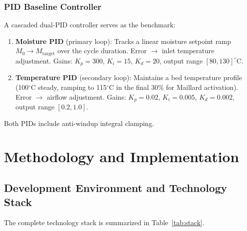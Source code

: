 ﻿\documentclass[12pt, a4paper]{report}
\begin{document}
\subsection{PID Baseline Controller}
A cascaded dual-PID controller serves as the benchmark:
\begin{enumerate}
    \item \textbf{Moisture PID} (primary loop): Tracks a linear moisture setpoint ramp $M_0 \to M_{\text{target}}$ over the cycle duration. Error $\to$ inlet temperature adjustment. Gains: $K_p = 300$, $K_i = 15$, $K_d = 20$, output range $[80, 130]^\circ$C.
    \item \textbf{Temperature PID} (secondary loop): Maintains a bed temperature profile (100$^\circ$C steady, ramping to 115$^\circ$C in the final 30\% for Maillard activation). Error $\to$ airflow adjustment. Gains: $K_p = 0.02$, $K_i = 0.005$, $K_d = 0.002$, output range $[0.2, 1.0]$.
\end{enumerate}
Both PIDs include anti-windup integral clamping.


\chapter{Methodology and Implementation}

\section{Development Environment and Technology Stack}
The complete technology stack is summarized in Table~\ref{tab:stack}.
\end{document}
